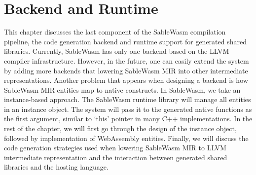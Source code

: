 \chapter{Backend and Runtime}
\label{chapter:backend-and-runtime}

This chapter discusses the last component of the SableWasm compilation pipeline, the code generation backend and runtime support for generated shared libraries. Currently, SableWasm has only one backend based on the LLVM compiler infrastructure. However, in the future, one can easily extend the system by adding more backends that lowering SableWasm MIR into other intermediate representations. Another problem that appears when designing a backend is how SableWasm MIR entities map to native constructs. In SableWasm, we take an instance-based approach. The SableWasm runtime library will manage all entities in an instance object. The system will pass it to the generated native functions as the first argument, similar to `this' pointer in many C++ implementations. In the rest of the chapter, we will first go through the design of the instance object, followed by implementation of WebAssembly entities. Finally, we will discuss the code generation strategies used when lowering SableWasm MIR to LLVM intermediate representation and the interaction between generated shared libraries and the hosting language.





